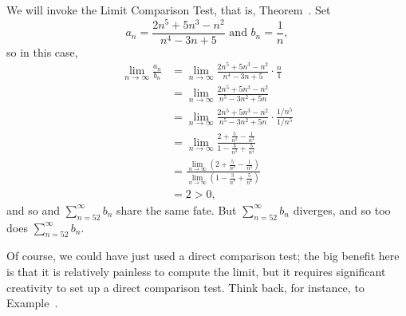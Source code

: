 \begin{solution}
  We will invoke the Limit Comparison Test, that is,
  Theorem~.  Set
  $$
a_n = \frac{2n^5 + 5n^3 - n^2}{n^4 - 3n + 5} \mbox{ and }
b_n = \frac{1}{n},
  $$
so in this case,
\begin{align*}
\lim_{n \to \infty} \frac{a_n}{b_n} &= \lim_{n \to \infty}  \frac{2n^5 + 5n^3 - n^2}{n^4 - 3n + 5} \cdot \frac{n}{1} \\
&= \lim_{n \to \infty}  \frac{2n^5 + 5n^3 - n^2}{n^5 - 3n^2 + 5n} \\
&= \lim_{n \to \infty}  \frac{2n^5 + 5n^3 - n^2}{n^5 - 3n^2 + 5n} \cdot \frac{1/n^5}{1/n^5} \\
&= \lim_{n \to \infty}  \frac{2 + \frac{5}{n^2} - \frac{1}{n^3}}{1 - \frac{3}{n^3} + \frac{5}{n^4}} \\
&= \frac{\lim_{n \to \infty} \left(2 + \frac{5}{n^2} - \frac{1}{n^3}\right)}{\lim_{n\to\infty} \left(1 - \frac{3}{n^3} + \frac{5}{n^4}\right)} \\
&= 2 > 0,
\end{align*}
and so and $\sum_{n=52}^\infty b_n$ share the same fate.  But $\sum_{n=52}^\infty b_n$ diverges, and so too does $\sum_{n=52}^\infty b_n$.
\end{solution}

Of course, we could have just used a direct comparison test; the big
benefit here is that it is relatively painless to compute the limit,
but it requires significant creativity to set up a direct comparison
test.  Think back, for instance, to
Example~.
